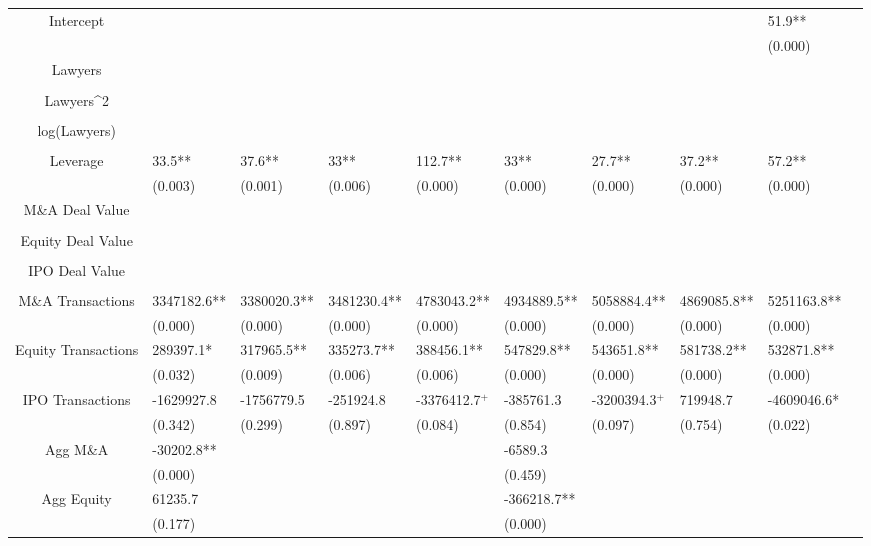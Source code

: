 \documentclass{article}
\begin{document}
\begin{table}[H]
\begin{tabular}{|clllllllll|}
Intercept &  &  &  &  &  &  &  & 51.9** & \\ 
   &  &  &  &  &  &  &  & (0.000) & \\ 
  Lawyers &  &  &  &  &  &  &  &  & \\ 
   &  &  &  &  &  &  &  &  & \\ 
  Lawyers^2 &  &  &  &  &  &  &  &  & \\ 
   &  &  &  &  &  &  &  &  & \\ 
  log(Lawyers) &  &  &  &  &  &  &  &  & \\ 
   &  &  &  &  &  &  &  &  & \\ 
  Leverage & 33.5** & 37.6** & 33** & 112.7** & 33** & 27.7** & 37.2** & 57.2** & \\ 
   & (0.003) & (0.001) & (0.006) & (0.000) & (0.000) & (0.000) & (0.000) & (0.000) & \\ 
  M\&A Deal Value &  &  &  &  &  &  &  &  & \\ 
   &  &  &  &  &  &  &  &  & \\ 
  Equity Deal Value &  &  &  &  &  &  &  &  & \\ 
   &  &  &  &  &  &  &  &  & \\ 
  IPO Deal Value &  &  &  &  &  &  &  &  & \\ 
   &  &  &  &  &  &  &  &  & \\ 
  M\&A Transactions & 3347182.6** & 3380020.3** & 3481230.4** & 4783043.2** & 4934889.5** & 5058884.4** & 4869085.8** & 5251163.8** & \\ 
   & (0.000) & (0.000) & (0.000) & (0.000) & (0.000) & (0.000) & (0.000) & (0.000) & \\ 
  Equity Transactions & 289397.1* & 317965.5** & 335273.7** & 388456.1** & 547829.8** & 543651.8** & 581738.2** & 532871.8** & \\ 
   & (0.032) & (0.009) & (0.006) & (0.006) & (0.000) & (0.000) & (0.000) & (0.000) & \\ 
  IPO Transactions & -1629927.8 & -1756779.5 & -251924.8 & -3376412.7$^{+}$ & -385761.3 & -3200394.3$^{+}$ & 719948.7 & -4609046.6* & \\ 
   & (0.342) & (0.299) & (0.897) & (0.084) & (0.854) & (0.097) & (0.754) & (0.022) & \\ 
  Agg M\&A & -30202.8** &  &  &  & -6589.3 &  &  &  & \\ 
   & (0.000) &  &  &  & (0.459) &  &  &  & \\ 
  Agg Equity & 61235.7 &  &  &  & -366218.7** &  &  &  & \\ 
   & (0.177) &  &  &  & (0.000) &  &  &  & \\ 

\end{tabular}
\end{table}
\end{document}
